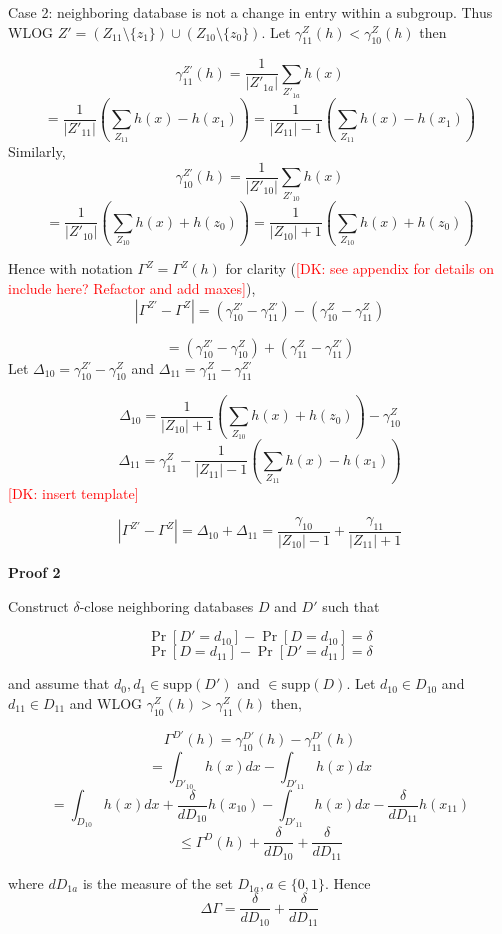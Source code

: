 \documentclass[runningheads]{article}
\newcommand{\dk}[1]{\textcolor{red}{[DK: #1]}}
\newcommand{\1}{\mathbbm{1}}
\theoremstyle{definition}
\begin{document}
Case 2: neighboring database is not a change in entry within a subgroup. Thus WLOG $Z' =(Z_{11}\setminus \{z_1\} )\cup( Z_{10}\setminus \{z_0\})$. Let $\gamma_{11}^{Z}(h) <\gamma_{10}^{Z}(h)$ then

$$\gamma_{11}^{Z'}(h) = \frac{1}{|Z'_{1a}|} \sum_{Z'_{1a}} h(x)$$
$$= \frac{1}{|Z'_{11}|} (\sum_{Z_{11}} h(x)-h(x_1)) = \frac{1}{|Z_{11}|-1} (\sum_{Z_{11}} h(x)-h(x_1))$$
Similarly, 
$$\gamma_{10}^{Z'}(h) = \frac{1}{|Z'_{10}|} \sum_{Z'_{10}} h(x)$$
$$ = \frac{1}{|Z'_{10}|} (\sum_{Z_{10}} h(x)+h(z_0))= \frac{1}{|Z_{10}|+1} (\sum_{Z_{10}} h(x)+h(z_0))$$

Hence with notation $ \Gamma^Z = \Gamma^Z(h)$ for clarity (\dk{see appendix for details on include here? Refactor and add maxes}), $$|\Gamma^{Z'}- \Gamma^{Z}| = (\gamma_{10}^{Z'} - \gamma_{11}^{Z'}) - (\gamma_{10}^{Z} - \gamma_{11}^{Z})$$


$$=(\gamma_{10}^{Z'}- \gamma_{10}^{Z}) + (\gamma_{11}^{Z} -\gamma_{11}^{Z'})$$
Let $\Delta_{10}= \gamma_{10}^{Z'}- \gamma_{10}^{Z}$ and  $\Delta_{11} = \gamma_{11}^{Z} -\gamma_{11}^{Z'}$

$$\Delta_{10} = \frac{1}{|Z_{10}|+1} (\sum_{Z_{10}} h(x)+h(z_0)) - \gamma_{10}^{Z}$$
$$\Delta_{11} = \gamma_{11}^{Z}- \frac{1}{|Z_{11}|-1} (\sum_{Z_{11}} h(x)-h(x_1))$$
\dk {insert template}

$$|\Gamma^{Z'}- \Gamma^{Z}| = \Delta_{10} + \Delta_{11}= \frac{\gamma_{10}}{|Z_{10}|-1} + \frac{\gamma_{11}}{|Z_{11}|+1} $$

{\bf Proof 2}

Construct $\delta$-close neighboring databases $D$ and $D'$ such that

$$\Pr[D'=d_{10}] - \Pr[D=d_{10}] = \delta$$
$$\Pr[D=d_{11}] - \Pr[D'=d_{11}] = \delta$$



and assume that $d_0, d_1 \in \text{supp}(D')$ and $\in \text{supp}(D)$. Let $d_{10} \in D_{10}$ and $d_{11} \in D_{11}$ and WLOG $\gamma_{10}^Z(h) > \gamma_{11}^Z(h)$ then,

$$\Gamma^{D'}(h) = \gamma_{10}^{D'}(h) - \gamma_{11}^{D'}(h)$$
$$= \int_{D'_{10}}h(x)dx - \int_{D'_{11}}h(x)dx$$
$$= \int_{D_{10}}h(x)dx + \frac{\delta}{dD_{10}}h(x_{10}) - \int_{D'_{11}}h(x)dx - \frac{\delta}{dD_{11}}h(x_{11})$$
$$\leq \Gamma^{D}(h) + \frac{\delta}{dD_{10}} + \frac{\delta}{dD_{11}}$$

where $dD_{1a}$ is the measure of the set $D_{1a}, a \in \{0,1\}$. Hence
$$\Delta\Gamma = \frac{\delta}{dD_{10}} + \frac{\delta}{dD_{11}}$$
\end{document}
